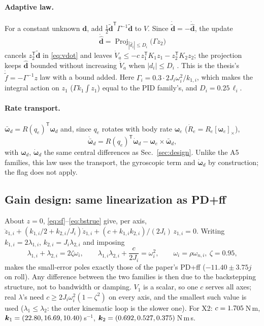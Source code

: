 \documentclass[11pt]{article}
\newcommand{\T}{^{\mathsf T}}
\newcommand{\code}[1]{\path{#1}}
\theoremstyle{remark}
\begin{document}
\paragraph{Adaptive law.} For a constant unknown $\bm d$, add $\frac12\tilde{\bm d}\T\Gamma^{-1}\tilde{\bm d}$ to $V$. Since
$\dot{\tilde{\bm d}}=-\dot{\hat{\bm d}}$, the update
\begin{equation}
\dot{\hat{\bm d}}=\operatorname{Proj}_{|\hat d_i|\le D_i}\big(\Gamma z_2\big)
\label{eq:adapt}
\end{equation}
cancels $z_2\T\tilde{\bm d}$ in \eqref{eq:vdot} and leaves $\dot V_a\le-c\,z_1\T K_1z_1-z_2\T K_2z_2$; the projection keeps
$\hat{\bm d}$ bounded without increasing $\dot V_a$ when $|d_i|\le D_i$ \cite{ioannou1996robust,krstic1995nonlinear}. This is the
thesis's $\dot{\tilde f}=-\Gamma^{-1}z$ law with a bound added. Here $\Gamma_i=0.3\cdot2J_i\omega_i^2/k_{1,i}$, which makes the
integral action on $z_1$ ($\Gamma k_1\!\int\!z_1$) equal to the PID family's, and $D_i=0.25\,\ell_i$.

\paragraph{Rate transport.} $\bar{\bm\omega}_d=R(q_e)\T\bm\omega_d$ and, since $q_e$ rotates with body rate $\bm\omega_e$
($\dot R_e=R_e[\bm\omega_e]_\times$),
\[
\dot{\bar{\bm\omega}}_d=R(q_e)\T\dot{\bm\omega}_d-\bm\omega_e\times\bar{\bm\omega}_d ,
\]
with $\bm\omega_d$, $\dot{\bm\omega}_d$ the same central differences as Sec.~\ref{sec:design}. Unlike the A5 families, this law
uses the transport, the gyroscopic term and $\dot{\bm\omega}_d$ by construction; the \code{--no-model-ff} flag does not apply.

\subsection{Gain design: same linearization as PD+ff}
About $z=0$, \eqref{eq:sf}--\eqref{eq:bstrue} give, per axis, $\ddot z_{1,i}+(k_{1,i}/2+k_{2,i}/J_i)\dot z_{1,i}+(c+k_{1,i}k_{2,i})/(2J_i)\,z_{1,i}=0$.
Writing $k_{1,i}=2\lambda_{1,i}$, $k_{2,i}=J_i\lambda_{2,i}$ and imposing
\[
\lambda_{1,i}+\lambda_{2,i}=2\zeta\omega_i,\qquad \lambda_{1,i}\lambda_{2,i}+\frac{c}{2J_i}=\omega_i^2,\qquad \omega_i=\rho\omega_{n,i},\ \zeta=0.95,
\]
makes the small-error poles exactly those of the paper's PD+ff ($-11.40\pm3.75j$ on roll). Any difference between the two
families is then due to the backstepping structure, not to bandwidth or damping. $V_1$ is a scalar, so one $c$ serves all
axes; real $\lambda$'s need $c\ge2J_i\omega_i^2(1-\zeta^2)$ on every axis, and the smallest such value is used
($\lambda_1\le\lambda_2$: the outer kinematic loop is the slower one). For X2: $c=1.705$\,N\,m,
$\bm k_1=(22.80, 16.69, 10.40)$\,s$^{-1}$, $\bm k_2=(0.692, 0.527, 0.375)$\,N\,m\,s.
\end{document}
